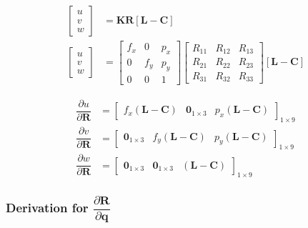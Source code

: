 \documentclass{article}
\renewcommand{\Vec}[1]{{\mathbf{#1}}}
\newcommand{\Mat}[1]{{\mathbf{#1}}}
\newcommand{\Zeros}[2]{{\Vec{0}_{#1\times#2}}}
\newcommand{\quat}{{\Vec{q}}}
\newcommand{\camRot}{{\Vec{R}}}
\newcommand{\camPos}{{\Vec{C}}}
\newcommand{\landmarkPos}{{\Vec{L}}}
\begin{document}
\begin{align}
  \begin{bmatrix} u \\ v \\ w \end{bmatrix}
    &= \Mat{K} \camRot [\landmarkPos - \camPos]
    \nonumber \\
  \begin{bmatrix} u \\ v \\ w \end{bmatrix}
  &= \begin{bmatrix}
      f_x & 0 & p_x \\
      0 & f_y & p_y \\
      0 & 0 & 1
  \end{bmatrix}
  \begin{bmatrix}
      R_{11} & R_{12} & R_{13} \\
      R_{21} & R_{22} & R_{23} \\
      R_{31} & R_{32} & R_{33}
  \end{bmatrix}
  [\landmarkPos - \camPos]
  \nonumber
\end{align}

\begin{align}
  \dfrac{\partial{u}}{\partial{\camRot}} &=
      \begin{bmatrix}
        f_{x} (\landmarkPos - \camPos) &
        \Zeros{1}{3} &
        p_{x} (\landmarkPos - \camPos)
      \end{bmatrix}_{1 \times 9} \\
  \dfrac{\partial{v}}{\partial{\camRot}} &=
    \begin{bmatrix}
      \Zeros{1}{3} &
      f_{y} (\landmarkPos - \camPos) &
      p_{y} (\landmarkPos - \camPos)
  \end{bmatrix}_{1 \times 9} \\
  \dfrac{\partial{w}}{\partial{\camRot}} &=
    \begin{bmatrix}
      \Zeros{1}{3} &
      \Zeros{1}{3} &
      (\landmarkPos - \camPos)
    \end{bmatrix}_{1 \times 9}
\end{align}


\subsubsection*{Derivation for \color{cyan}
$\dfrac{\partial{\camRot}}{\partial{\quat}}$}
\end{document}
